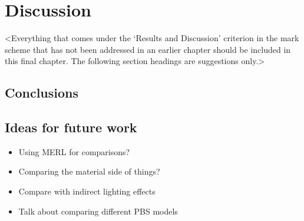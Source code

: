 \chapter{Discussion}
\label{chapter4}

<Everything that comes under the `Results and Discussion' criterion in the mark scheme that has not been addressed in an earlier chapter should be included in this final chapter. The following section headings are suggestions only.>

\section{Conclusions}
\lipsum[13]

\section{Ideas for future work}

\begin{itemize}
	\item Using MERL for comparisons?
	\item Comparing the material side of things?
	\item Compare with indirect lighting effects
	\item Talk about comparing different PBS models
\end{itemize}

